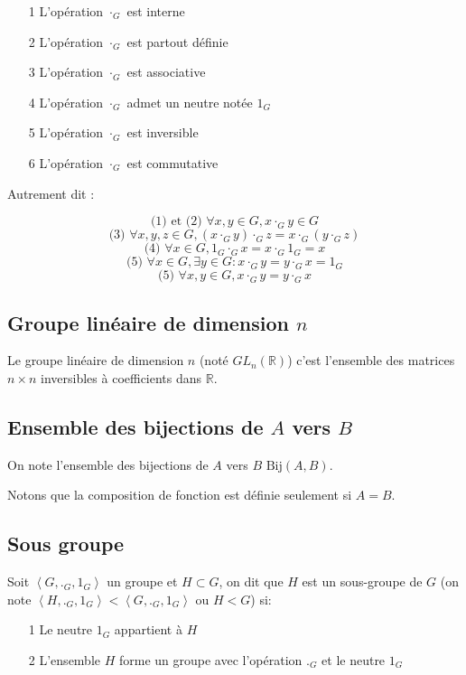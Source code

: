 \documentclass[a4paper,10pt]{article}
\newcommand{\grp}[1]{\left\langle #1 \right\rangle}
\begin{document}
\begin{itemize}
 \item[1]{L'opération $\cdot_G$ est interne}
 \item[2]{L'opération $\cdot_G$ est partout définie}
 \item[3]{L'opération $\cdot_G$ est associative}
 \item[4]{L'opération $\cdot_G$ admet un neutre notée $1_G$}
 \item[5]{L'opération $\cdot_G$ est inversible}
 \item[6]{L'opération $\cdot_G$ est commutative}
\end{itemize}

Autrement dit :

$$\mbox{(1) et (2) }\forall x,y \in G, x \cdot_G y \in G$$
$$\mbox{(3) } \forall x,y,z \in G, ( x \cdot_G y ) \cdot_G z = x \cdot_G ( y \cdot_G z )$$
$$\mbox{(4) } \forall x \in G, 1_G \cdot_G x = x \cdot_G 1_G = x$$
$$\mbox{(5) } \forall x \in G, \exists y \in G : x \cdot_G y = y \cdot_G x = 1_G$$
$$\mbox{(5) } \forall x,y \in G, x \cdot_G y = y \cdot_G x$$

\subsection{Groupe linéaire de dimension $n$}

Le groupe linéaire de dimension $n$ (noté $GL_n(\mathbb{R})$) c'est l'ensemble des matrices $n \times n$ inversibles à coefficients dans $\mathbb{R}$.

\subsection{Ensemble des bijections de $A$ vers $B$}

On note l'ensemble des bijections de $A$ vers $B$ $\mbox{Bij} (A,B)$.

Notons que la composition de fonction est définie seulement si $A=B$.

\subsection{Sous groupe}
Soit $\grp{G,._G,1_G}$ un groupe et $H \subset G$, on dit que $H$ est un sous-groupe de $G$ (on note $\grp{H,._G,1_G} < \grp{G,._G,1_G}$ ou $H < G$) si:

\begin{itemize}
 \item[1]{Le neutre $1_G$ appartient à $H$}
 \item[2]{L'ensemble $H$ forme un groupe avec l'opération $._G$ et le neutre $1_G$}
\end{itemize}
\end{document}
